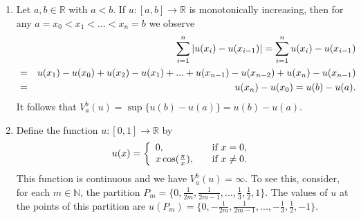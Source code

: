     \begin{example} %
    \label{ex:total_variation_one_d}

        \begin{enumerate}
            \item Let $a, b \in \mathbb{R}$ with $a < b$. If $u: [a, b] \longrightarrow \mathbb{R}$ is monotonically increasing, then for any $a = x_{0} < x_{1} < ... < x_{n} = b$ we observe
                \begin{eqnarray}
                    &&\sum_{i = 1}^{n} |u(x_{i}) - u(x_{i-1})| = \sum_{i = 1}^{n} u(x_{i}) - u(x_{i-1}) \notag \\
                    &=& u(x_{1}) - u(x_{0}) + u(x_{2}) - u(x_{1}) + ... + u(x_{n-1}) - u(x_{n-2}) + u(x_{n}) - u(x_{n-1}) \notag \\
                    &=& u(x_{n}) - u(x_{0}) = u(b) - u(a). \notag
                \end{eqnarray}
            It follows that $V^{b}_{a}(u) = \sup \{u(b) - u(a)\} = u(b) - u(a)$.
            \item Define the function $u: [0, 1] \longrightarrow \mathbb{R}$ by
                \begin{equation}
                    u(x) =
                    \left\{
                        \begin{array}{l l}
                            0,                      & \quad \text{if $x = 0$}, \\
                            x \cos(\frac{\pi}{x}),  & \quad \text{if $x \ne 0$}.
                        \end{array}
                    \right.
                \end{equation}
            This function is continuous and we have $V^{b}_{a}(u) = \infty$. To see this, consider, for each $m \in \mathbb{N}$, the partition $P_{m} = \{ 0, \frac{1}{2m}, \frac{1}{2m-1}, ..., \frac{1}{3}, \frac{1}{2}, 1 \}$. The values of $u$ at the points of this partition are $u(P_{m}) = \{ 0, -\frac{1}{2m}, \frac{1}{2m-1}, ..., -\frac{1}{3}, \frac{1}{2}, -1 \}$.



\end{enumerate}
\end{example}

